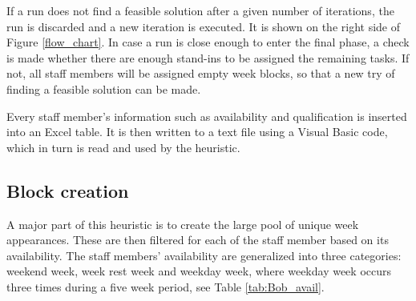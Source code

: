 \begin{figure}[!h]
{
		}
\end{figure}

If a run does not find a feasible solution after a given number of iterations, the run is discarded and a new iteration is executed. It is shown on the right side of Figure \ref{flow_chart}. In case a run is close enough to enter the final phase, a check is made whether there are enough stand-ins to be assigned the remaining tasks. If not, all staff members will be assigned empty week blocks, so that a new try of finding a feasible solution can be made.

Every staff member's information such as availability and qualification is inserted into an Excel table. It is then written to a text file using a Visual Basic code, which in turn is read and used by the heuristic.

\subsection{Block creation} \label{block_creation}
A major part of this heuristic is to create the large pool of unique week appearances. These are then filtered for each of the staff member based on its availability. The staff members' availability are generalized into three categories: weekend week, week rest week and weekday week, where weekday week occurs three times during a five week period, see Table \ref{tab:Bob_avail}. 


